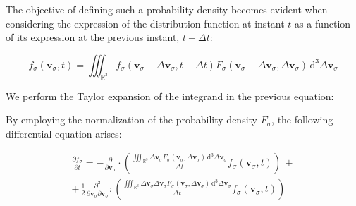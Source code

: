 The objective of defining such a probability density becomes evident when considering the expression of the distribution function at instant $t$ as a function of its expression at the previous instant, $t-\Delta t$:

\begin{equation}
    f_\sigma(\mathbf{v}_\sigma,t)=\iiint_{\mathbb{R}^3}f_\sigma(\mathbf{v}_\sigma-\Delta\mathbf{v}_\sigma,t-\Delta t)F_\sigma(\mathbf{v}_\sigma-\Delta\mathbf{v}_\sigma,\Delta\mathbf{v}_\sigma)\,\mathrm{d}^3\Delta\mathbf{v}_\sigma
\end{equation}

We perform the Taylor expansion of the integrand in the previous equation:

By employing the normalization of the probability density $F_\sigma$, the following differential equation arises:

\iffalse

\begin{gather}
    \frac{\partial f_\sigma}{\partial t}=-\frac{\partial}{\partial\mathbf{v}_\sigma}\cdot\left(\frac{\iiint_{\mathbb{R}^3}\Delta\mathbf{v}_\sigma F_\sigma(\mathbf{v}_\sigma,\Delta\mathbf{v}_\sigma)\,\mathrm{d}^3\Delta\mathbf{v}_\sigma}{\Delta t}f_\sigma(\mathbf{v}_\sigma,t)\right)\,+\\+\,\frac{1}{2}\frac{\partial^2}{\partial\mathbf{v}_\sigma\partial\mathbf{v}_\sigma}:\left(\frac{\iiint_{\mathbb{R}^3}\Delta\mathbf{v}_\sigma\Delta\mathbf{v}_\sigma F_\sigma(\mathbf{v}_\sigma,\Delta\mathbf{v}_\sigma)\,\mathrm{d}^3\Delta\mathbf{v}_\sigma}{\Delta t}f_\sigma(\mathbf{v}_\sigma,t)\right)
\end{gather}

